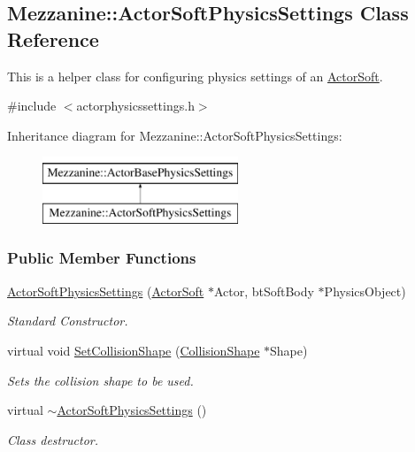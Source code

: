 \hypertarget{classMezzanine_1_1ActorSoftPhysicsSettings}{
\subsection{Mezzanine::ActorSoftPhysicsSettings Class Reference}
\label{classMezzanine_1_1ActorSoftPhysicsSettings}
}


This is a helper class for configuring physics settings of an \hyperlink{classMezzanine_1_1ActorSoft}{ActorSoft}.  




{\ttfamily \#include $<$actorphysicssettings.h$>$}

Inheritance diagram for Mezzanine::ActorSoftPhysicsSettings:\begin{figure}[H]
\begin{center}
\leavevmode
\includegraphics[height=2.000000cm]{classMezzanine_1_1ActorSoftPhysicsSettings}
\end{center}
\end{figure}
\subsubsection*{Public Member Functions}
\begin{DoxyCompactItemize}
\item 
\hyperlink{classMezzanine_1_1ActorSoftPhysicsSettings_a1dbdd3a7b8af36cb8353a1af90102073}{ActorSoftPhysicsSettings} (\hyperlink{classMezzanine_1_1ActorSoft}{ActorSoft} $\ast$Actor, btSoftBody $\ast$PhysicsObject)
\begin{DoxyCompactList}\small\item\em Standard Constructor. \item\end{DoxyCompactList}\item 
virtual void \hyperlink{classMezzanine_1_1ActorSoftPhysicsSettings_a4cbaf52fbdedf9c4e0328d3dd608207e}{SetCollisionShape} (\hyperlink{classMezzanine_1_1CollisionShape}{CollisionShape} $\ast$Shape)
\begin{DoxyCompactList}\small\item\em Sets the collision shape to be used. \item\end{DoxyCompactList}\item 
\hypertarget{classMezzanine_1_1ActorSoftPhysicsSettings_a9bd95e4279191ab50e5d60ad4ec07817}{
virtual \hyperlink{classMezzanine_1_1ActorSoftPhysicsSettings_a9bd95e4279191ab50e5d60ad4ec07817}{$\sim$ActorSoftPhysicsSettings} ()}
\label{classMezzanine_1_1ActorSoftPhysicsSettings_a9bd95e4279191ab50e5d60ad4ec07817}

\begin{DoxyCompactList}\small\item\em Class destructor. \item\end{DoxyCompactList}\end{DoxyCompactItemize}
